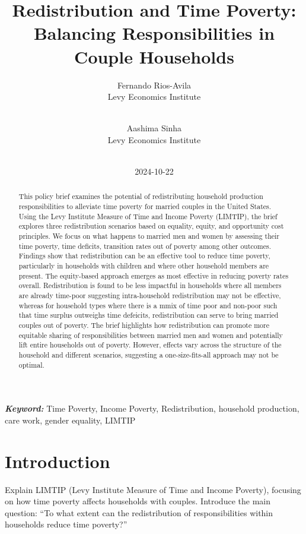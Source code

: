 \documentclass[
  11pt,
]{article}
\title{Redistribution and Time Poverty: Balancing Responsibilities in
Couple Households}
\author{
Fernando Rios-Avila\\
Levy Economics Institute\\
\\
\and 
Aashima Sinha\\
Levy Economics Institute\\
\\
}
\date{2024-10-22}
\begin{document}
\def\spacingset#1{\renewcommand{\baselinestretch}%
{#1}\small\normalsize} \spacingset{1}


\maketitle
\begin{abstract}
This policy brief examines the potential of redistributing household
production responsibilities to alleviate time poverty for married
couples in the United States. Using the Levy Institute Measure of Time
and Income Poverty (LIMTIP), the brief explores three redistribution
scenarios based on equality, equity, and opportunity cost principles. We
focus on what happens to married men and women by assessing their time
poverty, time deficits, transition rates out of poverty among other
outcomes. Findings show that redistribution can be an effective tool to
reduce time poverty, particularly in households with children and where
other household members are present. The equity-based approach emerges
as most effective in reducing poverty rates overall. Redistribution is
found to be less impactful in households where all members are already
time-poor suggesting intra-household redistribution may not be
effective, whereas for household types where there is a mmix of time
poor and non-poor such that time surplus outweighs time defeicits,
redistribution can serve to bring married couples out of poverty. The
brief highlights how redistribution can promote more equitable sharing
of responsibilities between married men and women and potentially lift
entire households out of poverty. However, effects vary across the
structure of the household and different scenarios, suggesting a
one-size-fits-all approach may not be optimal.
\end{abstract}
 
\vspace{.2in}

\textbf{\textit{Keyword: }}Time Poverty, Income Poverty, Redistribution,
household production, care work, gender equality, LIMTIP


\thispagestyle{empty}
\clearpage{}
\newpage
\spacingset{1.2} %
\section{Introduction}\label{introduction}

Explain LIMTIP (Levy Institute Measure of Time and Income Poverty),
focusing on how time poverty affects households with couples. Introduce
the main question: ``To what extent can the redistribution of
responsibilities within households reduce time poverty?''
\end{document}
